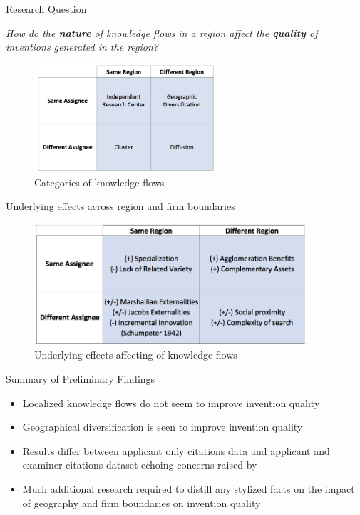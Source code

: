 \documentclass{beamer}
\begin{document}
\begin{frame}{Research Question}{}

\textit{How do the \textbf{nature} of knowledge flows in a region affect the \textbf{quality} of inventions generated in the region?}
\begin{figure}[h!]
\begin{centering}
  \includegraphics[width=0.6\textwidth]{2x2old}
  \caption{Categories of knowledge flows}
   \label{fig:2x2old}
\end{centering}
\end{figure}
\end{frame}

\begin{frame}{Underlying effects across region and firm boundaries}
\begin{figure}[h!]
\begin{centering}
  \includegraphics[width=0.9\textwidth]{2x2effects}
  \caption{Underlying effects affecting of knowledge flows}
   \label{fig:2x2effects}
\end{centering}
\end{figure}
\end{frame}

\begin{frame}{Summary of Preliminary Findings}{}
\begin{itemize}
\item{Localized knowledge flows do not seem to improve invention quality}
\item{Geographical diversification is seen to improve invention quality}
\item{Results differ between applicant only citations data and applicant and examiner citations dataset echoing concerns raised by \cite{Alcacer2006a}}
\item{Much additional research required to distill any stylized facts on the impact of geography and firm boundaries on invention quality}
\end{itemize}
\end{frame}
\end{document}
